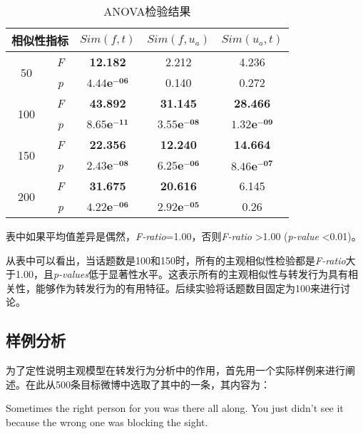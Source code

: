 \begin{table}[htb]
\scriptsize
\centering
\caption{ANOVA检验结果} 
\label{tab6-3}
\begin{threeparttable}
\begin{tabular}{|c|c|c|c|c|}
\hline
\multicolumn{2}{|c|}{相似性指标}& $ Sim(f,t) $ & $ Sim(f,u_a)  $ & $ Sim(u_a,t)  $\\
\hline
\multirow{2}{*}{50} & \textit{F} & \textbf{12.182} & 2.212 & 4.236 \\
\cline{2-5}
  & \textit{p} &  $\mathbf{4.44e^{-06}}$  & 0.140 & 0.272\\
\hline
\multirow{2}{*}{100} & \textit{F} & \textbf{43.892} & \textbf{31.145} & \textbf{28.466} \\
\cline{2-5}
  & \textit{p} &  $\mathbf{8.65e^{-11}}$  & $\mathbf{3.55e^{-08}}$ & $\mathbf{1.32e^{-09}}$\\
\hline
\multirow{2}{*}{150} & \textit{F} & \textbf{22.356} & \textbf{12.240} & \textbf{14.664} \\
\cline{2-5}
  & \textit{p} &  $\mathbf{2.43e^{-08}}$  & $\mathbf{6.25e^{-06}}$ & $\mathbf{8.46e^{-07}}$\\
\hline
\multirow{2}{*}{200} & \textit{F} & \textbf{31.675} & \textbf{20.616} & 6.145\\
\cline{2-5}
  & \textit{p} &  $\mathbf{4.22e^{-06}}$  & $\mathbf{2.92e^{-05}}$ & 0.26\\
\hline
\end{tabular}
\begin{tablenotes}
  \footnotesize
\item 表中如果平均值差异是偶然，\textit{F-ratio}=1.00，否则\textit{F-ratio} \textgreater 1.00 (\textit{p-value} \textless 0.01)。\\
\end{tablenotes}
\end{threeparttable}
\end{table}

从表中可以看出，当话题数是100和150时，所有的主观相似性检验都是\textit{F-ratio}大于1.00，且\textit{p-values}低于显著性水平。这表示所有的主观相似性与转发行为具有相关性，能够作为转发行为的有用特征。后续实验将话题数目固定为100来进行讨论。

\subsection{样例分析}
\label{example}
为了定性说明主观模型在转发行为分析中的作用，首先用一个实际样例来进行阐述。在此从500条目标微博中选取了其中的一条，其内容为：
\begin{description}
\item Sometimes the right person for you was there all along. You just didn’t see it because the wrong one was blocking the sight.
\end{description}

